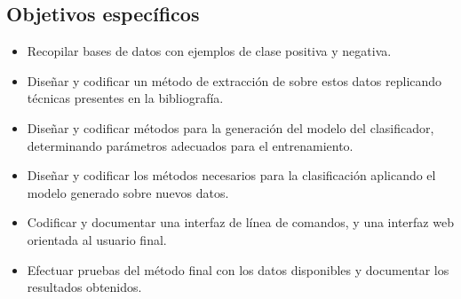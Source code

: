 %
%
\subsection{Objetivos específicos}
%
\begin{itemize}
\item Recopilar bases de datos con ejemplos de clase positiva y
  negativa.
\item Diseñar y codificar un método de extracción de  sobre
  estos datos replicando técnicas presentes en la bibliografía.
\item Diseñar y codificar métodos para la generación del modelo del
  clasificador, determinando parámetros adecuados para el
  entrenamiento. 
\item Diseñar y codificar los métodos necesarios para la clasificación
  aplicando el modelo generado sobre nuevos datos.
\item Codificar y documentar una interfaz de línea de comandos, y una
  interfaz web orientada al usuario final.
\item Efectuar pruebas del método final con los datos disponibles y
  documentar los resultados obtenidos.
\end{itemize}
%

